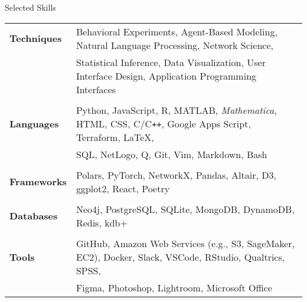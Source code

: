 \documentclass{cv} %
\begin{document}

\begin{cvSection}{Selected Skills}

  \begin{tabular}{ @{} >{\bfseries}l @{\hspace{1em}} l }
    Techniques & Behavioral Experiments, Agent-Based Modeling, Natural Language Processing, Network Science,
    \\
               & Statistical Inference, Data Visualization, User Interface Design, Application Programming Interfaces
    \\
    \\
    Languages  & Python, JavaScript, R, MATLAB, \textit{Mathematica}, HTML, CSS, C/C\texttt{++}, Google Apps Script, Terraform, \LaTeX{},
    \\
               & SQL, NetLogo, Q, Git, Vim, Markdown, Bash
    \\
    \\
    Frameworks & Polars, PyTorch, NetworkX, Pandas, Altair, D3, ggplot2, React, Poetry
    \\
    \\
    Databases  & Neo4j, PostgreSQL, SQLite, MongoDB, DynamoDB, Redis, kdb+
    \\
    \\
    Tools      & GitHub, Amazon Web Services (e.g., S3, SageMaker, EC2), Docker, Slack, VSCode, RStudio, Qualtrics, SPSS,
    \\
               & Figma, Photoshop, Lightroom, Microsoft Office
  \end{tabular}

\end{cvSection}
\end{document}

